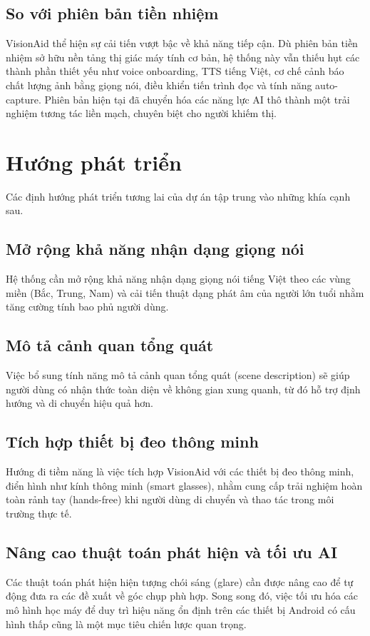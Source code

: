 \documentclass[a4paper,13pt]{report}
\begin{document}
\subsection{So với phiên bản tiền nhiệm}
VisionAid thể hiện sự cải tiến vượt bậc về khả năng tiếp cận. Dù phiên bản tiền nhiệm sở hữu nền tảng thị giác máy tính cơ bản, hệ thống này vẫn thiếu hụt các thành phần thiết yếu như voice onboarding, TTS tiếng Việt, cơ chế cảnh báo chất lượng ảnh bằng giọng nói, điều khiển tiến trình đọc và tính năng auto-capture. Phiên bản hiện tại đã chuyển hóa các năng lực AI thô thành một trải nghiệm tương tác liền mạch, chuyên biệt cho người khiếm thị.

\section{Hướng phát triển}

Các định hướng phát triển tương lai của dự án tập trung vào những khía cạnh sau.

\subsection{Mở rộng khả năng nhận dạng giọng nói}
Hệ thống cần mở rộng khả năng nhận dạng giọng nói tiếng Việt theo các vùng miền (Bắc, Trung, Nam) và cải tiến thuật dạng phát âm của người lớn tuổi nhằm tăng cường tính bao phủ người dùng.

\subsection{Mô tả cảnh quan tổng quát}
Việc bổ sung tính năng mô tả cảnh quan tổng quát (scene description) sẽ giúp người dùng có nhận thức toàn diện về không gian xung quanh, từ đó hỗ trợ định hướng và di chuyển hiệu quả hơn.

\subsection{Tích hợp thiết bị đeo thông minh}
Hướng đi tiềm năng là việc tích hợp VisionAid với các thiết bị đeo thông minh, điển hình như kính thông minh (smart glasses), nhằm cung cấp trải nghiệm hoàn toàn rảnh tay (hands-free) khi người dùng di chuyển và thao tác trong môi trường thực tế.

\subsection{Nâng cao thuật toán phát hiện và tối ưu AI}
Các thuật toán phát hiện hiện tượng chói sáng (glare) cần được nâng cao để tự động đưa ra các đề xuất về góc chụp phù hợp. Song song đó, việc tối ưu hóa các mô hình học máy để duy trì hiệu năng ổn định trên các thiết bị Android có cấu hình thấp cũng là một mục tiêu chiến lược quan trọng.
\end{document}
